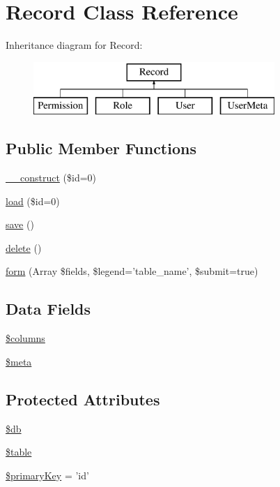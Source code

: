 \hypertarget{class_record}{\section{Record Class Reference}
\label{class_record}
}
Inheritance diagram for Record\-:\begin{figure}[H]
\begin{center}
\leavevmode
\includegraphics[height=2.000000cm]{class_record}
\end{center}
\end{figure}
\subsection*{Public Member Functions}
\begin{DoxyCompactItemize}
\item 
\hyperlink{class_record_a4e176c3a661053094339903c5cfc7942}{\-\_\-\-\_\-construct} (\$id=0)
\item 
\hyperlink{class_record_a7160b09d9d37ede69811a66dc9e4f272}{load} (\$id=0)
\item 
\hyperlink{class_record_afc8a3c62679cf00ade9f15fb2a6d6132}{save} ()
\item 
\hyperlink{class_record_a13bdffdd926f26b825ea57066334ff01}{delete} ()
\item 
\hyperlink{class_record_a93614c4fd6ba6715b5d339e6b4720d34}{form} (Array \$fields, \$legend='table\-\_\-name', \$submit=true)
\end{DoxyCompactItemize}
\subsection*{Data Fields}
\begin{DoxyCompactItemize}
\item 
\hyperlink{class_record_a19d2a3d21fe02053311fde465e6ae2e9}{\$columns}
\item 
\hyperlink{class_record_a9e6fc1ae0498be7d1e682f8bcc9299df}{\$meta}
\end{DoxyCompactItemize}
\subsection*{Protected Attributes}
\begin{DoxyCompactItemize}
\item 
\hyperlink{class_record_a1fa3127fc82f96b1436d871ef02be319}{\$db}
\item 
\hyperlink{class_record_ae8876a14058f368335baccf35af4a22b}{\$table}
\item 
\hyperlink{class_record_a927b0256b942a3ee89485f2649af7981}{\$primary\-Key} = 'id'
\end{DoxyCompactItemize}



